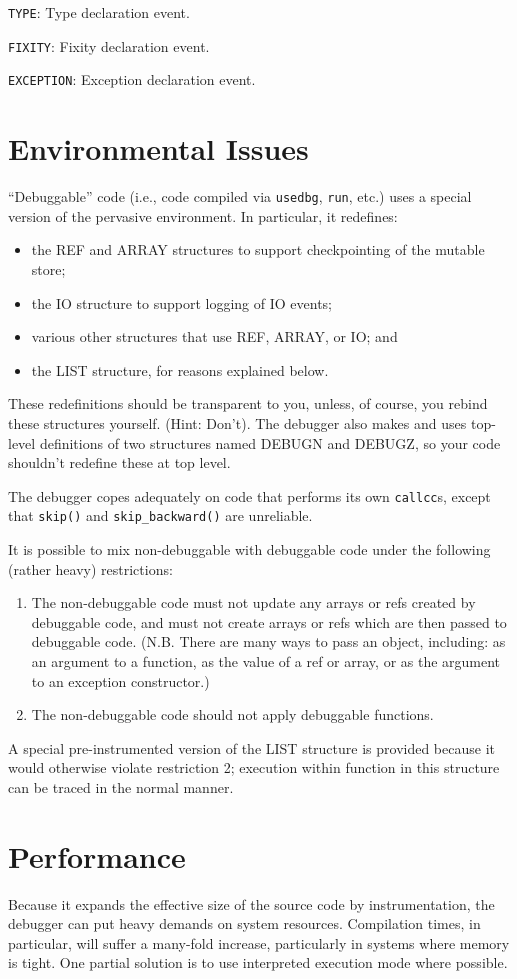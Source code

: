 \verb'TYPE': Type declaration event.

\verb'FIXITY': Fixity declaration event.

\verb'EXCEPTION': Exception declaration event.

\section{Environmental Issues}
``Debuggable'' code (i.e., code compiled via  \verb'usedbg', \verb'run', etc.)
uses a special version of the pervasive environment.  In particular, it 
redefines:
\begin{itemize}
\item the REF and ARRAY structures to support checkpointing of the mutable
store;
\item the IO structure to support logging of IO events;
\item various other structures that use REF, ARRAY, or IO; and
\item the LIST structure, for reasons explained below.
\end{itemize}
These redefinitions should be transparent to you, unless, of course, you
rebind these structures yourself. (Hint: Don't).  The debugger also makes
and uses top-level definitions of two structures named DEBUGN and DEBUGZ,
so your code shouldn't redefine these at top level.

The debugger copes adequately on code that performs its own \verb'callcc's,
except that \verb'skip()' and \verb'skip_backward()' are unreliable.

It is possible to mix non-debuggable with debuggable code under the
following (rather heavy) restrictions:
\begin{enumerate}
  \item The non-debuggable code must not update any arrays or refs created by
debuggable code, and must not create arrays or refs which are then passed
to debuggable code.  (N.B. There are many ways to pass an object, including:
as an argument to a function, as the value of a ref or array, or as the
argument to an exception constructor.)
  \item The non-debuggable code should not apply debuggable functions. 
\end{enumerate}
A special pre-instrumented 
version of the LIST structure is provided because it would otherwise violate
restriction 2; execution within function in this structure can be traced
in the normal manner.

\section{Performance}
Because it expands the effective size of the source code by instrumentation,
the debugger can put heavy demands on system resources.  Compilation times,
in particular, will suffer a many-fold increase, particularly in systems
where memory is tight.  One partial solution is to use interpreted execution 
mode where possible.

